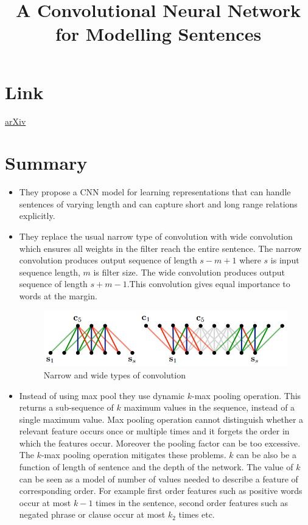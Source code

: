 \documentclass{article}
\title{A Convolutional Neural Network for Modelling Sentences}
\author{}
\date{}
\begin{document}
\maketitle

\section*{Link}
\href{https://arxiv.org/abs/1404.2188}{arXiv} 

\section*{Summary}
\begin{itemize}
    \item They propose a CNN model for learning representations that can handle sentences of varying length and can capture short and long range relations explicitly.
    \item They replace the usual narrow type of convolution with wide convolution which ensures all weights in the filter reach the entire sentence. The narrow convolution produces output sequence of length $s-m+1$ where $s$ is input sequence length, $m$ is filter size. The wide convolution produces output sequence of length $s+m-1$.This convolution gives equal importance to words at the margin.
    \begin{figure}[H]
        \centering
        \includegraphics[scale=0.7]{convolution.png}
        \caption{Narrow and wide types of convolution}
        \label{fig:Figure 1}
    \end{figure}
    \item Instead of using max pool they use dynamic $k$-max pooling operation. This returns a sub-sequence of $k$ maximum values in the sequence, instead of a single maximum value. Max pooling operation cannot distinguish whether a relevant feature occurs once or multiple times and it forgets the order in which the features occur. Moreover the pooling factor can be too excessive. The $k$-max pooling operation mitigates these problems. $k$ can be also be a function of length of sentence and the depth of the network. The value of $k$ can be seen as a model of number of values needed to describe a feature of corresponding order. For example first order features such as positive words occur at most $k-1$ times in the sentence, second order features such as negated phrase or clause occur at most $k_2$ times etc.  

\end{itemize}
\end{document}
